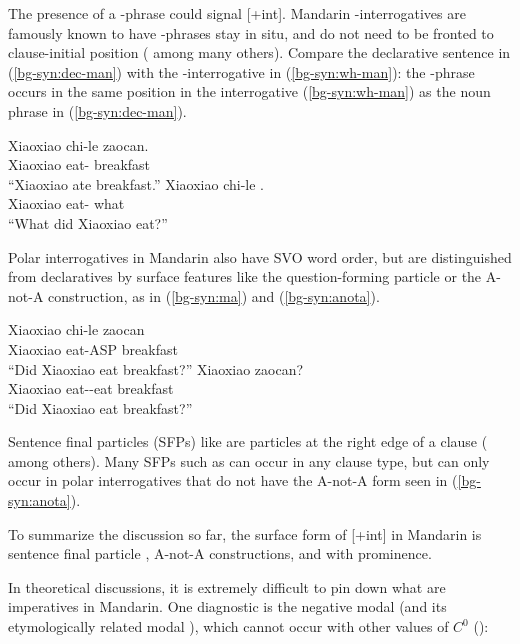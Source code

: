 The presence of a \twh-phrase could signal [+int]. Mandarin \twh-interrogatives are famously known to have \twh-phrases stay in situ, and do not need to be fronted to clause-initial position (\citealt{huang1982, cheng1991} among many others). Compare the declarative sentence in (\ref{bg-syn:dec-man}) with the \twh-interrogative in (\ref{bg-syn:wh-man}): the \twh-phrase  occurs in the same position in the interrogative (\ref{bg-syn:wh-man}) as the noun phrase  in (\ref{bg-syn:dec-man}). 


\gll Xiaoxiao	chi-le zaocan.\\
Xiaoxiao eat-\Asp{} breakfast \\
``Xiaoxiao ate breakfast.''
\eex
{}
\gll Xiaoxiao	chi-le .\\
Xiaoxiao eat-\Asp{} what \\
``What did Xiaoxiao eat?''
\eex



Polar interrogatives in Mandarin also have SVO word order, but are distinguished from declaratives by surface features like the question-forming particle  or the A-not-A construction, as in (\ref{bg-syn:ma}) and (\ref{bg-syn:anota}).

\gll Xiaoxiao	chi-le	zaocan		\\
Xiaoxiao	eat-ASP	breakfast	\Sfp{}\\
``Did Xiaoxiao eat breakfast?''
\eex
{}
\gll Xiaoxiao		zaocan?\\
	Xiaoxiao	eat-\Neg-eat	breakfast\\
	``Did Xiaoxiao eat breakfast?''
\eex


Sentence final particles (SFPs) like \ma{} are  particles at the right edge of a clause (\citealt{chao1968, zhudexi, huang1982, cheng1991, liboya2006} among others). Many SFPs such as  can occur in any clause type, but \ma{} can only occur in polar interrogatives that do not have the A-not-A form seen in (\ref{bg-syn:anota}). 




To summarize the discussion so far, the surface form of [+int] in Mandarin is sentence final particle \ma{}, A-not-A constructions, and \twh{} with prominence. 

In theoretical discussions, it is extremely difficult to pin down what are imperatives in Mandarin. One diagnostic is the negative modal  (and its etymologically related modal ), which cannot occur with other values of $C^{0}$ (\cite{chao1968, lithompson}):

